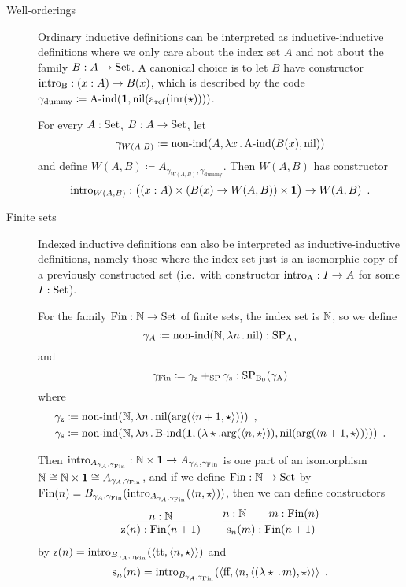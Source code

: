 \documentclass{article}
\begin{document}
\begin{description}
\item[Well-orderings] Ordinary inductive definitions can be
  interpreted as inductive-inductive definitions where we only care
  about the index set $A$ and not about the family $B : A \to \text{Set}$. A
  canonical choice is to let $B$ have constructor $\text{intro}_{\mathrm{B}} : (x : A)
  \to B(x)$, which is described by the code $\gamma_{\text{dummy}} \coloneqq 
  \text{A-ind}(\mathbf{1}, \text{nil}(\text{a}_{\mathrm{ref}}(\text{inr}(\star))))$.

  For every $A : \text{Set}$, $B : A \to \text{Set}$, let
  \[
  \gamma_{W(A, B)} \coloneqq \text{non-ind}(A, \lambda x\,.\,\text{A-ind}(B(x),\text{nil}))
  \]
  and define $W(A, B) \coloneqq A_{\gamma_{W(A, B)},
    \gamma_{\text{dummy}}}$.  Then $W(A, B)$ has constructor
  \[
  \text{intro}_{W(A, B)} : \big((x : A) \times (B(x) \to W(A, B)) \times \mathbf{1}\big) \to W(A, B) \enspace .
  \]

\item[Finite sets] Indexed inductive definitions can also be
  interpreted as inductive-inductive definitions, namely those where
  the index set just is an isomorphic copy of a previously constructed
  set (i.e.\ with constructor $\text{intro}_{\mathrm{A}} : I \to A$ for some $I : \text{Set}$).

  For the family $\text{Fin} : \mathbb{N} \to \text{Set}$ of finite sets, the index set
  is $\mathbb{N}$, so we define
  \[
  \gamma_A \coloneqq \text{non-ind}(\mathbb{N}, \lambda n\,.\,\text{nil}) : \text{SP}_{\mathrm{A}_0}
  \]
  and
  \[
  \gamma_{\text{Fin}} \coloneqq \gamma_{\text{z}} +_{\text{SP}} \gamma_{\text{s}} : \text{SP}_{\mathrm{B}_0}(\gamma_{\mathrm{A}})
  \]
  where
  \begin{align*}
    \gamma_{\text{z}} &\coloneqq \text{non-ind}(\mathbb{N}, \lambda n\,.\,\text{nil}(\text{arg}(\langle n + 1 , \star\rangle))) \enspace ,\\
    \gamma_{\text{s}} &\coloneqq \text{non-ind}(\mathbb{N}, \lambda n\,.\,\text{B-ind}(\mathbf{1}, (\lambda \star . \text{arg}(\langle n , \star\rangle)), \text{nil}(\text{arg}(\langle n + 1 , \star\rangle)))) \enspace .
  \end{align*} 

  Then $\text{intro}_{A_{\gamma_A, \gamma_{\text{Fin}}}} : \mathbb{N} \times \mathbf{1} \to
  A_{\gamma_A, \gamma_{\text{Fin}}}$ is one part of an isomorphism $\mathbb{N}
  \cong \mathbb{N} \times \mathbf{1} \cong A_{\gamma_A, \gamma_{\text{Fin}}}$, and if we
  define $\text{Fin} : \mathbb{N} \to \text{Set}$ by $\text{Fin}(n) = B_{\gamma_A,
    \gamma_{\text{Fin}}}(\text{intro}_{A_{\gamma_A,
    \gamma_{\text{Fin}}}}(\langle n , \star\rangle))$, then we can define
  constructors
  \begin{align*}
    \infer{\finzero{n} : \Fin(n + 1)}{n : \Nat} \qquad
\infer{\finsucc{n}{m} : \Fin(n + 1)}{n : \Nat & \quad m : \Fin(n)}
  \end{align*}
  by $\text{z}(n) = \text{intro}_{B_{\gamma_A,
      \gamma_{\text{Fin}}}}(\langle \text{tt} , \langle n , \star\rangle\rangle)$ and
  \[
  \text{s}_{n}(m) = \text{intro}_{B_{\gamma_A,
      \gamma_{\text{Fin}}}}(\langle \text{ff} , \langle n , \langle (\lambda
        \star\,.\,m) , \star\rangle\rangle\rangle \enspace .
  \]


\end{description}
\end{document}
